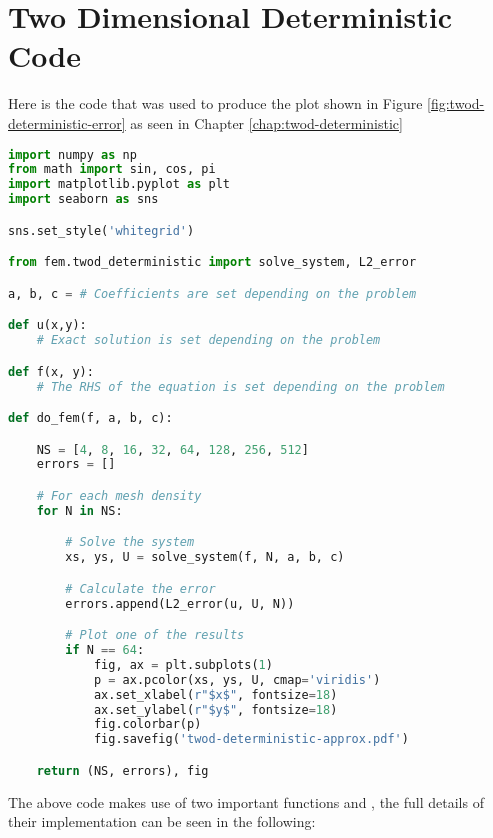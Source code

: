 \chapter{Two Dimensional Deterministic Code}\label{app:twod-deterministic-code}

Here is the code that was used to produce the plot shown in Figure
\ref{fig:twod-deterministic-error} as seen in Chapter
\ref{chap:twod-deterministic}

\begin{lstlisting}[language=Python,
                   caption={Setup code for the 2D Deterministic Finite Element
                            Method},
                   label={code:twod-deterministic}]
import numpy as np
from math import sin, cos, pi
import matplotlib.pyplot as plt
import seaborn as sns

sns.set_style('whitegrid')

from fem.twod_deterministic import solve_system, L2_error

a, b, c = # Coefficients are set depending on the problem

def u(x,y):
    # Exact solution is set depending on the problem

def f(x, y):
    # The RHS of the equation is set depending on the problem

def do_fem(f, a, b, c):

    NS = [4, 8, 16, 32, 64, 128, 256, 512]
    errors = []

    # For each mesh density
    for N in NS:

        # Solve the system
        xs, ys, U = solve_system(f, N, a, b, c)

        # Calculate the error
        errors.append(L2_error(u, U, N))

        # Plot one of the results
        if N == 64:
            fig, ax = plt.subplots(1)
            p = ax.pcolor(xs, ys, U, cmap='viridis')
            ax.set_xlabel(r"$x$", fontsize=18)
            ax.set_ylabel(r"$y$", fontsize=18)
            fig.colorbar(p)
            fig.savefig('twod-deterministic-approx.pdf')

    return (NS, errors), fig
\end{lstlisting}

The above code makes use of two important functions  and
, the full details of their implementation can be seen in the
following:


